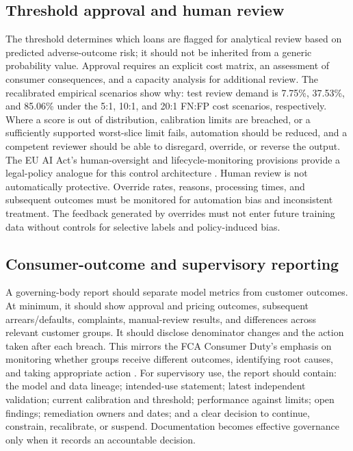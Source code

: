 \documentclass[10pt]{article}
\begin{document}
\subsection{Threshold approval and human review}

The threshold determines which loans are flagged for analytical review based on predicted adverse-outcome risk; it should not be inherited from a generic probability value. Approval requires an explicit cost matrix, an assessment of consumer consequences, and a capacity analysis for additional review. The recalibrated empirical scenarios show why: test review demand is 7.75\%, 37.53\%, and 85.06\% under the 5:1, 10:1, and 20:1 FN:FP cost scenarios, respectively. Where a score is out of distribution, calibration limits are breached, or a sufficiently supported worst-slice limit fails, automation should be reduced, and a competent reviewer should be able to disregard, override, or reverse the output. The EU AI Act's human-oversight and lifecycle-monitoring provisions provide a legal-policy analogue for this control architecture \cite{ref40}. Human review is not automatically protective. Override rates, reasons, processing times, and subsequent outcomes must be monitored for automation bias and inconsistent treatment. The feedback generated by overrides must not enter future training data without controls for selective labels and policy-induced bias.

\subsection{Consumer-outcome and supervisory reporting}

A governing-body report should separate model metrics from customer outcomes. At minimum, it should show approval and pricing outcomes, subsequent arrears/defaults, complaints, manual-review results, and differences across relevant customer groups. It should disclose denominator changes and the action taken after each breach. This mirrors the FCA Consumer Duty's emphasis on monitoring whether groups receive different outcomes, identifying root causes, and taking appropriate action \cite{ref46}. For supervisory use, the report should contain: the model and data lineage; intended-use statement; latest independent validation; current calibration and threshold; performance against limits; open findings; remediation owners and dates; and a clear decision to continue, constrain, recalibrate, or suspend. Documentation becomes effective governance only when it records an accountable decision.
\end{document}
